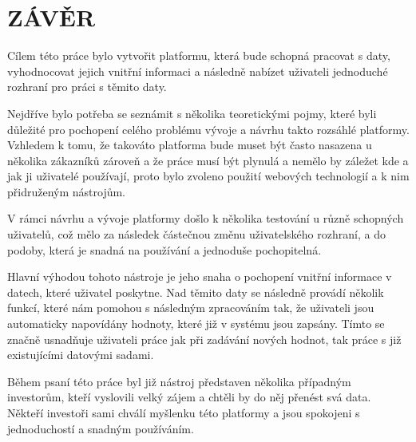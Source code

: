 \chapter*{ZÁVĚR}
\par Cílem této práce bylo vytvořit platformu, která bude schopná pracovat s daty, vyhodnocovat jejich vnitřní informaci a následně nabízet uživateli jednoduché rozhraní pro práci s těmito daty.

\par Nejdříve bylo potřeba se seznámit s několika teoretickými pojmy, které byli důležité pro pochopení celého problému vývoje a návrhu takto rozsáhlé platformy. Vzhledem k tomu, že takováto platforma bude muset být často nasazena u několika zákazníků zároveň a že práce musí být plynulá a nemělo by záležet kde a jak ji uživatelé používají, proto bylo zvoleno použití webových technologií a k nim přidruženým nástrojům.

\par V rámci návrhu a vývoje platformy došlo k několika testování u různě schopných uživatelů, což mělo za následek částečnou změnu uživatelského rozhraní, a do podoby, která je snadná na používání a jednoduše pochopitelná.

\par Hlavní výhodou tohoto nástroje je jeho snaha o pochopení vnitřní informace v datech, které uživatel poskytne. Nad těmito daty se následně provádí několik funkcí, které nám pomohou s následným zpracováním tak, že uživateli jsou automaticky napovídány hodnoty, které již v systému jsou zapsány. Tímto se značně usnadňuje uživateli práce jak při zadávání nových hodnot, tak práce s již existujícími datovými sadami.

\par Během psaní této práce byl již nástroj představen několika případným investorům, kteří vyslovili velký zájem a chtěli by do něj přenést svá data. Někteří investoři sami chválí myšlenku této platformy a jsou spokojeni s jednoduchostí a snadným používáním.